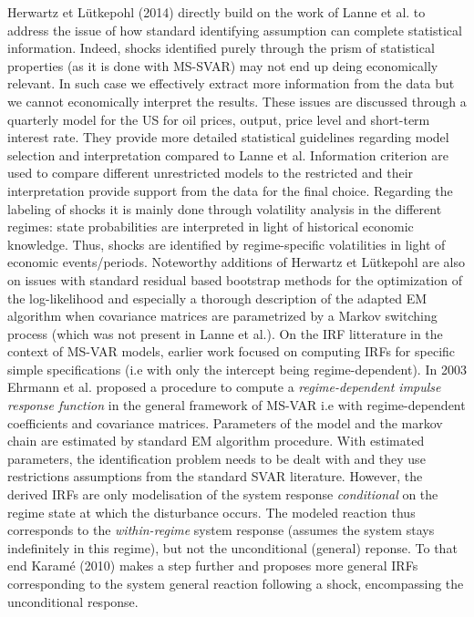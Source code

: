 \quad Herwartz et Lütkepohl (2014) \cite{HL} directly build on the work of Lanne et al. to address the issue of how standard identifying assumption can complete statistical information.
Indeed, shocks identified purely through the prism of statistical properties (as it is done with MS-SVAR) may not end up deing economically relevant. 
In such case we effectively extract more information from the data but we cannot economically interpret the results.
These issues are discussed through a quarterly model for the US for oil prices, output, price level and short-term interest rate. 
They provide more detailed statistical guidelines regarding model selection and interpretation compared to Lanne et al. 
Information criterion are used to compare different unrestricted models to the restricted and their interpretation provide support from the data for the final choice.
Regarding the labeling of shocks it is mainly done through volatility analysis in the different regimes: state probabilities are interpreted in light of historical economic knowledge.
Thus, shocks are identified by regime-specific volatilities in light of economic events/periods. 
Noteworthy additions of Herwartz et Lütkepohl are also on issues with standard residual based bootstrap methods for the optimization of the log-likelihood and especially a thorough description of the adapted EM algorithm when covariance matrices are parametrized by a Markov switching process (which was not present in Lanne et al.).
\bigbreak
On the IRF litterature in the context of MS-VAR models, earlier work focused on computing IRFs for specific simple specifications (i.e with only the intercept being regime-dependent). 
In 2003 Ehrmann et al. \cite{Ehrmann} proposed a procedure to compute a \textit{regime-dependent impulse response function} in the general framework of MS-VAR i.e with regime-dependent coefficients and covariance matrices.
Parameters of the model and the markov chain are estimated by standard EM algorithm procedure. With estimated parameters, the identification problem needs to be dealt with and they use restrictions assumptions from the standard SVAR literature.
However, the derived IRFs are only modelisation of the system response \textit{conditional} on the regime state at which the disturbance occurs. The modeled reaction thus corresponds to the \textit{within-regime} system response (assumes the system stays indefinitely in this regime), but not the unconditional (general) reponse.
To that end Karamé (2010) \cite{Krame} makes a step further and proposes more general IRFs corresponding to the system general reaction following a shock, encompassing the unconditional response.
